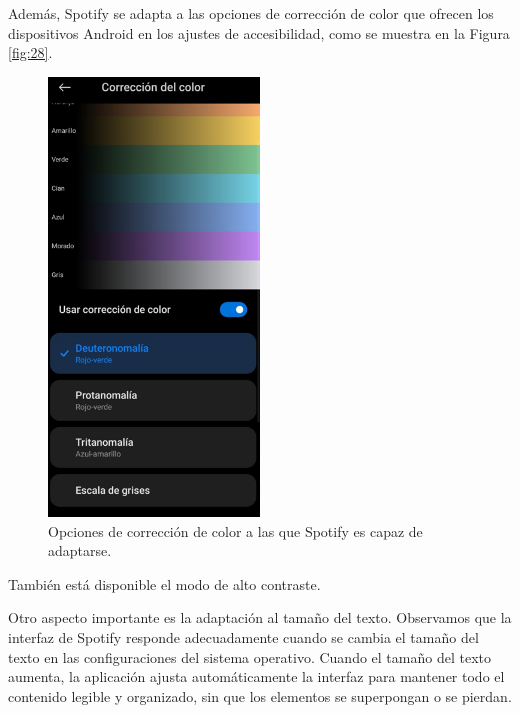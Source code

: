 \documentclass[letterpaper, 12pt]{report}
\begin{document}
Además, Spotify se adapta a las opciones de corrección de color que ofrecen los dispositivos Android en los ajustes de accesibilidad, como se muestra en la Figura \ref{fig:28}.

\begin{figure}[H]
\centering
\includegraphics[width=0.5\textwidth]{figure29.png}
\caption{Opciones de corrección de color a las que Spotify es capaz de adaptarse.}
\label{fig:29}
\end{figure}

También está disponible el modo de alto contraste.

Otro aspecto importante es la adaptación al tamaño del texto. Observamos que la interfaz de Spotify responde adecuadamente cuando se cambia el tamaño del texto en las configuraciones del sistema operativo. Cuando el tamaño del texto aumenta, la aplicación ajusta automáticamente la interfaz para mantener todo el contenido legible y organizado, sin que los elementos se superpongan o se pierdan.
\end{document}

